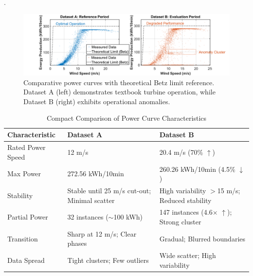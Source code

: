 .\documentclass[a4paper,11pt]{article}
\begin{document}
 

\begin{figure}[h!]
    \centering
    \includegraphics[width=\textwidth]{photo/Figure1_PowerCurvesComparison.png}
    \caption{Comparative power curves with theoretical Betz limit reference. Dataset A (left) demonstrates textbook turbine operation, while Dataset B (right) exhibits operational anomalies.}
    \label{fig:powercurves}
\end{figure}

\vspace{-15pt}
 

\begin{table}[ht]
\centering
\small
\setlength{\tabcolsep}{8pt}
\begin{tabular}{|l|p{6.7cm}|p{6.7cm}|}
\hline
\textbf{Characteristic} & \textbf{Dataset A} & \textbf{Dataset B} \\ 
\hline\hline
Rated Power Speed & 12 m/s & 20.4 m/s (70\% $\uparrow$) \\ 
\hline
Max Power & 272.56 kWh/10min & 260.26 kWh/10min (4.5\% $\downarrow$) \\ 
\hline
Stability & Stable until 25 m/s cut-out; Minimal scatter & High variability $>$15 m/s; Reduced stability \\ 
\hline
Partial Power & 32 instances ($\sim$100 kWh) & 147 instances (4.6$\times$ $\uparrow$); Strong cluster \\ 
\hline
Transition & Sharp at 12 m/s; Clear phases & Gradual; Blurred boundaries \\ 
\hline
Data Spread & Tight clusters; Few outliers & Wide scatter; High variability \\ 
\hline
\end{tabular}
\caption{Compact Comparison of Power Curve Characteristics}
\label{tab:compact_compare}
\end{table}
\vspace{-15pt}



 

 
\end{document}
